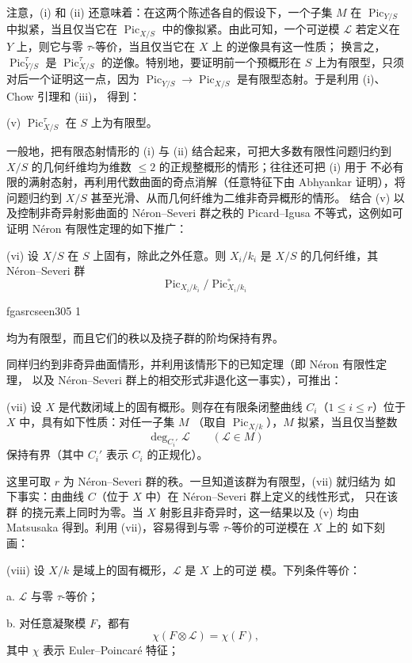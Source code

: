 \documentclass[12pt,twoside,openany]{book}
\numberwithin{equation}{section}
\newcommand{\fgaunitid}{unbound}
\newcommand{\src}[1]{%
  \phantomsection
  \hypertarget{src:\fgaunitid:#1}{}%
  \hypertarget{fga.\fgaunitid.p#1}{}%
  \ifcsname fgasrcseen#1\endcsname\else
    \expandafter\gdef\csname fgasrcseen#1\endcsname{1}%
    \hypertarget{src:#1}{}%
  \fi
  \marginpar{\raggedleft\footnotesize\sffamily #1}%
}
\theoremstyle{plain}
\theoremstyle{definition}
\theoremstyle{remark}
\begin{document}
注意，(i) 和 (ii) 还意味着：在这两个陈述各自的假设下，一个子集 $M$ 在
$\operatorname{Pic}_{Y/S}$ 中拟紧，当且仅当它在
$\operatorname{Pic}_{X/S}$ 中的像拟紧。由此可知，一个可逆模
$\mathcal L$ 若定义在 $Y$ 上，则它与零 $\tau$-等价，当且仅当它在 $X$ 上
的逆像具有这一性质；
换言之，$\operatorname{Pic}_{Y/S}^\tau$ 是
$\operatorname{Pic}_{X/S}^\tau$ 的逆像。特别地，要证明前一个预概形在
$S$ 上为有限型，只须对后一个证明这一点，因为
$\operatorname{Pic}_{Y/S}\longrightarrow
\operatorname{Pic}_{X/S}$ 是有限型态射。于是利用 (i)、Chow 引理和 (iii)，
得到：

\medskip
\noindent(v) $\operatorname{Pic}_{X/S}^\tau$ 在 $S$ 上为有限型。

一般地，把有限态射情形的 (i) 与 (ii) 结合起来，可把大多数有限性问题归约到
$X/S$ 的几何纤维均为维数 $\leq2$ 的正规整概形的情形；往往还可把 (i) 用于
不必有限的满射态射，再利用代数曲面的奇点消解（任意特征下由 Abhyankar
证明），将问题归约到 $X/S$ 甚至光滑、从而几何纤维为二维非奇异概形的情形。
结合 (v) 以及控制非奇异射影曲面的 Néron--Severi 群之秩的 Picard--Igusa
不等式，这例如可证明 Néron 有限性定理的如下推广：

\medskip
\noindent(vi) 设 $X/S$ 在 $S$ 上固有，除此之外任意。则 $X_i/k_i$ 是
$X/S$ 的几何纤维，其 Néron--Severi 群
\[
\operatorname{Pic}_{X_i/k_i}/\operatorname{Pic}_{X_i/k_i}^\circ
\]

\src{305}
均为有限型，而且它们的秩以及挠子群的阶均保持有界。

同样归约到非奇异曲面情形，并利用该情形下的已知定理（即 Néron 有限性定理，
以及 Néron--Severi 群上的相交形式非退化这一事实），可推出：

\medskip
\noindent(vii) 设 $X$ 是代数闭域上的固有概形。则存在有限条闭整曲线
$C_i$（$1\leq i\leq r$）位于 $X$ 中，具有如下性质：对任一子集 $M$
（取自 $\operatorname{Pic}_{X/k}$），$M$ 拟紧，当且仅当整数
\[
\deg_{C_i'}\mathcal L\qquad(\mathcal L\in M)
\]
保持有界（其中 $C_i'$ 表示 $C_i$ 的正规化）。

这里可取 $r$ 为 Néron--Severi 群的秩。一旦知道该群为有限型，(vii) 就归结为
如下事实：由曲线 $C$（位于 $X$ 中）在 Néron--Severi 群上定义的线性形式，
只在该群
的挠元素上同时为零。当 $X$ 射影且非奇异时，这一结果以及 (v) 均由
Matsusaka 得到。利用 (vii)，容易得到与零 $\tau$-等价的可逆模在 $X$ 上的
如下刻画：

\medskip
\noindent(viii) 设 $X/k$ 是域上的固有概形，$\mathcal L$ 是 $X$ 上的可逆
模。下列条件等价：

\noindent a. $\mathcal L$ 与零 $\tau$-等价；

\noindent b. 对任意凝聚模 $F$，都有
\[
\chi(F\otimes\mathcal L)=\chi(F),
\]
其中 $\chi$ 表示 Euler--Poincaré 特征；
\end{document}
